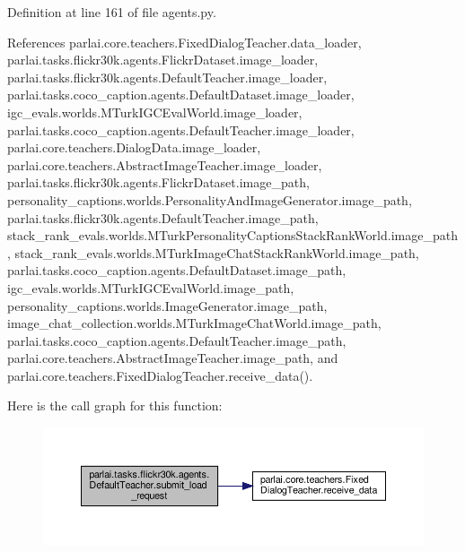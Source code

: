 Definition at line 161 of file agents.\+py.



References parlai.\+core.\+teachers.\+Fixed\+Dialog\+Teacher.\+data\+\_\+loader, parlai.\+tasks.\+flickr30k.\+agents.\+Flickr\+Dataset.\+image\+\_\+loader, parlai.\+tasks.\+flickr30k.\+agents.\+Default\+Teacher.\+image\+\_\+loader, parlai.\+tasks.\+coco\+\_\+caption.\+agents.\+Default\+Dataset.\+image\+\_\+loader, igc\+\_\+evals.\+worlds.\+M\+Turk\+I\+G\+C\+Eval\+World.\+image\+\_\+loader, parlai.\+tasks.\+coco\+\_\+caption.\+agents.\+Default\+Teacher.\+image\+\_\+loader, parlai.\+core.\+teachers.\+Dialog\+Data.\+image\+\_\+loader, parlai.\+core.\+teachers.\+Abstract\+Image\+Teacher.\+image\+\_\+loader, parlai.\+tasks.\+flickr30k.\+agents.\+Flickr\+Dataset.\+image\+\_\+path, personality\+\_\+captions.\+worlds.\+Personality\+And\+Image\+Generator.\+image\+\_\+path, parlai.\+tasks.\+flickr30k.\+agents.\+Default\+Teacher.\+image\+\_\+path, stack\+\_\+rank\+\_\+evals.\+worlds.\+M\+Turk\+Personality\+Captions\+Stack\+Rank\+World.\+image\+\_\+path, stack\+\_\+rank\+\_\+evals.\+worlds.\+M\+Turk\+Image\+Chat\+Stack\+Rank\+World.\+image\+\_\+path, parlai.\+tasks.\+coco\+\_\+caption.\+agents.\+Default\+Dataset.\+image\+\_\+path, igc\+\_\+evals.\+worlds.\+M\+Turk\+I\+G\+C\+Eval\+World.\+image\+\_\+path, personality\+\_\+captions.\+worlds.\+Image\+Generator.\+image\+\_\+path, image\+\_\+chat\+\_\+collection.\+worlds.\+M\+Turk\+Image\+Chat\+World.\+image\+\_\+path, parlai.\+tasks.\+coco\+\_\+caption.\+agents.\+Default\+Teacher.\+image\+\_\+path, parlai.\+core.\+teachers.\+Abstract\+Image\+Teacher.\+image\+\_\+path, and parlai.\+core.\+teachers.\+Fixed\+Dialog\+Teacher.\+receive\+\_\+data().

Here is the call graph for this function\+:
\nopagebreak
\begin{figure}[H]
\begin{center}
\leavevmode
\includegraphics[width=350pt]{classparlai_1_1tasks_1_1flickr30k_1_1agents_1_1DefaultTeacher_aac22712a270cb75686f9595913ab6970_cgraph}
\end{center}
\end{figure}


